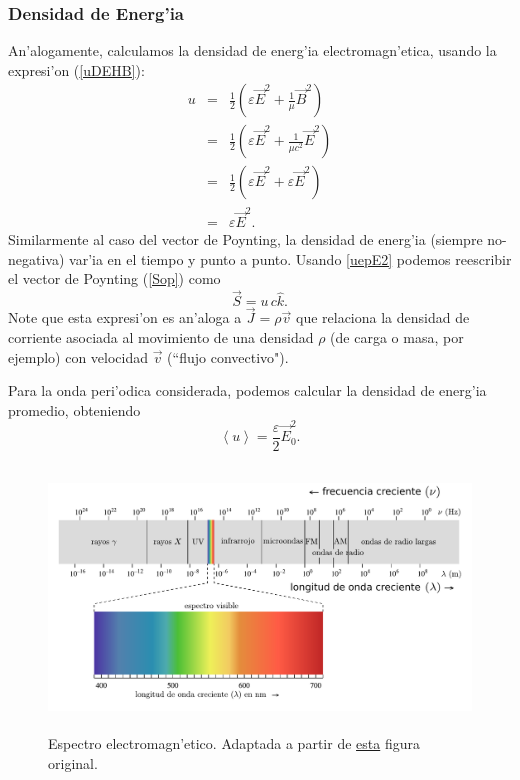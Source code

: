 \subsubsection{Densidad de Energ'ia}
An'alogamente, calculamos la densidad de energ'ia electromagn'etica, usando la expresi'on (\ref{uDEHB}):
\begin{eqnarray}
 u&=&\frac{1}{2}\left(\varepsilon\vec{E}^2+\frac{1}{\mu}\vec{B}^2\right)\\
&=&\frac{1}{2}\left(\varepsilon\vec{E}^2+\frac{1}{\mu c^2}\vec{E}^2\right)\\
&=&\frac{1}{2}\left(\varepsilon\vec{E}^2+\varepsilon\vec{E}^2\right)\\
&=&\varepsilon\vec{E}^2. \label{uepE2}
\end{eqnarray}
Similarmente al caso del vector de Poynting, la densidad de energ'ia (siempre no-negativa) var'ia en el tiempo y punto a punto. 
Usando \eqref{uepE2} podemos reescribir el vector de Poynting (\ref{Sop}) como
\begin{equation}
 \vec{S}=u\,c\hat{k}.
\end{equation}
Note que esta expresi'on es an'aloga a $\vec{J}=\rho\vec{v}$ que relaciona la densidad de corriente asociada al movimiento de una densidad $\rho$ (de carga o masa, por ejemplo) con velocidad $\vec{v}$ (``flujo convectivo").

Para la onda peri'odica considerada, podemos calcular la densidad de energ'ia promedio, obteniendo
\begin{equation}\label{uprom}
\left<u\right>=\frac{\varepsilon}{2}\vec{E}_0^2.
\end{equation}

\begin{figure}[!h]
\centerline{\includegraphics[height=7cm]{fig/fig-EM_spectrum_es.pdf}}
\caption{Espectro electromagn'etico. Adaptada a partir de \href{http://commons.wikimedia.org/wiki/File:EM_spectrum_es.svg}{esta} figura original.}
\label{fig:EMS}
\end{figure}

